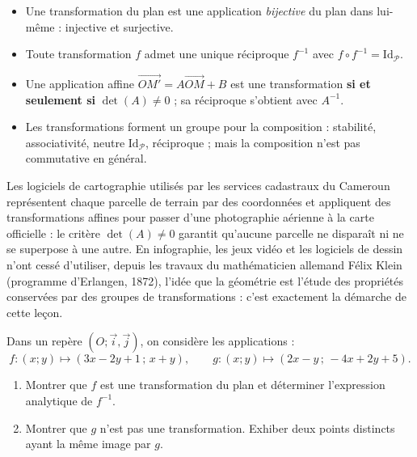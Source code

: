 \documentclass[11pt]{article}
\newcommand{\cle}[1]{{\popxbold\color{popdark}#1}}
\begin{document}
\begin{aretenir}
\begin{itemize}
\item Une \cle{transformation du plan} est une application \emph{bijective} du plan dans lui-même : injective et surjective.
\item Toute transformation $f$ admet une unique réciproque $f^{-1}$ avec $f \circ f^{-1} = \mathrm{Id}_{\mathcal{P}}$.
\item Une application affine $\overrightarrow{OM'} = A\overrightarrow{OM} + B$ est une transformation \textbf{si et seulement si} $\det(A) \neq 0$ ; sa réciproque s'obtient avec $A^{-1}$.
\item Les transformations forment un groupe pour la composition : stabilité, associativité, neutre $\mathrm{Id}_{\mathcal{P}}$, réciproque ; mais la composition n'est pas commutative en général.
\end{itemize}
\end{aretenir}

\begin{savaistu}
Les logiciels de cartographie utilisés par les services cadastraux du Cameroun représentent chaque parcelle de terrain par des coordonnées et appliquent des transformations affines pour passer d'une photographie aérienne à la carte officielle : le critère $\det(A) \neq 0$ garantit qu'aucune parcelle ne \og disparaît \fg{} ni ne se superpose à une autre. En infographie, les jeux vidéo et les logiciels de dessin n'ont cessé d'utiliser, depuis les travaux du mathématicien allemand Félix Klein (programme d'Erlangen, 1872), l'idée que la géométrie est l'étude des propriétés conservées par des groupes de transformations : c'est exactement la démarche de cette leçon.
\end{savaistu}

\begin{exercice}
Dans un repère $(O ; \vec{i}, \vec{j})$, on considère les applications :
\[ f : (x ; y) \mapsto (3x - 2y + 1 \,;\, x + y), \qquad g : (x ; y) \mapsto (2x - y \,;\, -4x + 2y + 5). \]
\begin{enumerate}
\item Montrer que $f$ est une transformation du plan et déterminer l'expression analytique de $f^{-1}$.
\item Montrer que $g$ n'est pas une transformation. Exhiber deux points distincts ayant la même image par $g$.
\end{enumerate}
\end{exercice}
\end{document}
